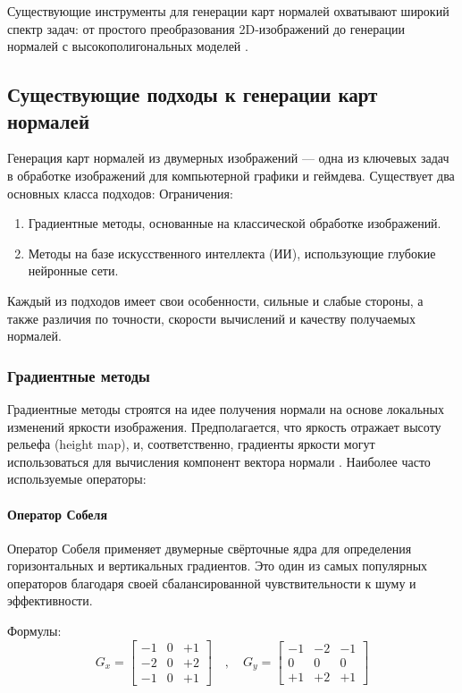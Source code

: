 Существующие инструменты для генерации карт нормалей охватывают широкий спектр задач: от простого преобразования 2D-изображений до генерации нормалей с высокополигональных моделей \cite{baskar2023}.
\subsection{Существующие подходы к генерации карт нормалей}

Генерация карт нормалей из двумерных изображений — одна из ключевых задач в обработке изображений для компьютерной графики и геймдева. Существует два основных класса подходов:
Ограничения:
\begin{enumerate}
	\item Градиентные методы, основанные на классической обработке изображений.
	\item Методы на базе искусственного интеллекта (ИИ), использующие глубокие нейронные сети.
\end{enumerate}

Каждый из подходов имеет свои особенности, сильные и слабые стороны, а также различия по точности, скорости вычислений и качеству получаемых нормалей.
\subsubsection{Градиентные методы}

Градиентные методы строятся на идее получения нормали на основе локальных изменений яркости изображения. Предполагается, что яркость отражает высоту рельефа (height map), и, соответственно, градиенты яркости могут использоваться для вычисления компонент вектора нормали \cite{yane2021}. Наиболее часто используемые операторы:
\paragraph{Оператор Собеля}

Оператор Собеля применяет двумерные свёрточные ядра для определения горизонтальных и вертикальных градиентов. Это один из самых популярных операторов благодаря своей сбалансированной чувствительности к шуму и эффективности.

Формулы:
\[
G_x =
\begin{bmatrix}
	-1 & 0 & +1 \\
	-2 & 0 & +2 \\
	-1 & 0 & +1
\end{bmatrix}
\quad , \quad
G_y =
\begin{bmatrix}
	-1 & -2 & -1 \\
	0 & 0 & 0 \\
	+1 & +2 & +1
\end{bmatrix}
\]

